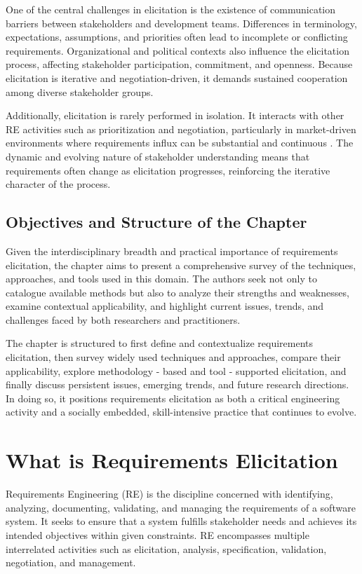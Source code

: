 One of the central challenges in elicitation is the existence of communication barriers between stakeholders and development teams. Differences in terminology, expectations, assumptions, and priorities often lead to incomplete or conflicting requirements. Organizational and political contexts also influence the elicitation process, affecting stakeholder participation, commitment, and openness. Because elicitation is iterative and negotiation-driven, it demands sustained cooperation among diverse stakeholder groups.

Additionally, elicitation is rarely performed in isolation. It interacts with other RE activities such as prioritization and negotiation, particularly in market-driven environments where requirements influx can be substantial and continuous \cite{Robertson1999}. The dynamic and evolving nature of stakeholder understanding means that requirements often change as elicitation progresses, reinforcing the iterative character of the process.

\subsection{Objectives and Structure of the Chapter}

Given the interdisciplinary breadth and practical importance of requirements elicitation, the chapter aims to present a comprehensive survey of the techniques, approaches, and tools used in this domain. The authors seek not only to catalogue available methods but also to analyze their strengths and weaknesses, examine contextual applicability, and highlight current issues, trends, and challenges faced by both researchers and practitioners.

The chapter is structured to first define and contextualize requirements elicitation, then survey widely used techniques and approaches, compare their applicability, explore methodology - based and tool - supported elicitation, and finally discuss persistent issues, emerging trends, and future research directions. In doing so, it positions requirements elicitation as both a critical engineering activity and a socially embedded, skill-intensive practice that continues to evolve.

\section{What is Requirements Elicitation}
Requirements Engineering (RE) is the discipline concerned with identifying, analyzing, documenting, validating, and managing the requirements of a software system. It seeks to ensure that a system fulfills stakeholder needs and achieves its intended objectives within given constraints. RE encompasses multiple interrelated activities such as elicitation, analysis, specification, validation, negotiation, and management.

